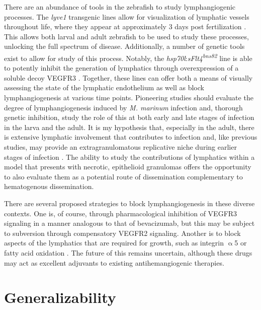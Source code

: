 There are an abundance of tools in the zebrafish to study lymphangiogenic processes. The \textit{lyve1} transgenic lines allow for visualization of lymphatic vessels throughout life, where they appear at approximately 3 days post fertilization \citep{Okuda2012}. This allows both larval and adult zebrafish to be used to study these processes, unlocking the full spectrum of disease. Additionally, a number of genetic tools exist to allow for study of this process. Notably, the \textit{hsp70l}:\textit{sFlt4\textsuperscript{bns82}} line is able to potently inhibit the generation of lymphatics through overexpression of a soluble decoy VEGFR3 \citep{Matsuoka2016}. Together, these lines can offer both a means of visually assessing the state of the lymphatic endothelium as well as block lymphangiogenesis at various time points. Pioneering studies should evaluate the degree of lymphangiogenesis induced by \textit{M. marinum} infection and, thorough genetic inhibition, study the role of this at both early and late stages of infection in the larva and the adult. It is my hypothesis that, especially in the adult, there is extensive lymphatic involvement that contributes to infection and, like previous studies, may provide an extragranulomatous replicative niche during earlier stages of infection \citep{Lerner2016}. The ability to study the contributions of lymphatics within a model that presents with necrotic, epithelioid granulomas offers the opportunity to also evaluate them as a potential route of dissemination complementary to hematogenous dissemination. 

There are several proposed strategies to block lymphangiogenesis in these diverse contexts. One is, of course, through pharmacological inhibition of VEGFR3 signaling in a manner analogous to that of bevacizumab, but this may be subject to subversion through compensatory VEGFR2 signaling. Another is to block aspects of the lymphatics that are required for growth, such as integrin $\upalpha$5 \citep{Dietrich2007} or fatty acid oxidation \citep{Wong2017b}. The future of this remains uncertain, although these drugs may act as excellent adjuvants to existing antihemangiogenic therapies.

\section{Generalizability}

